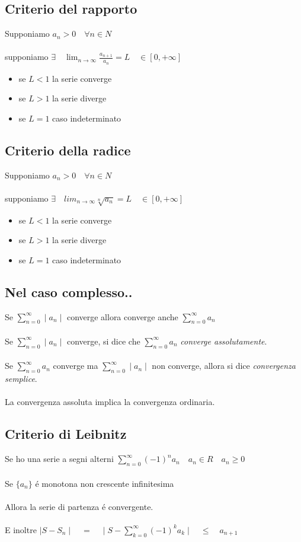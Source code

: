 \documentclass[a4paper,10pt,italian]{article}
\begin{document}
\subsection{Criterio del rapporto}
Supponiamo $a_n > 0 \quad \forall n \in N$ \\ \\
supponiamo $\exists \quad \lim_{n\rightarrow\infty} \frac{a_{n+1}}{a_n} = L \quad \in[0, +\infty]$
\begin{itemize}
\item se $L < 1$ la serie converge
\item se $L > 1$ la serie diverge
\item se $L = 1$ caso indeterminato
\end{itemize}

\subsection{Criterio della radice}
Supponiamo $a_n > 0 \quad \forall n \in N$ \\ \\
supponiamo $\exists \quad lim_{n\rightarrow\infty} \sqrt[n]{a_n} = L \quad \in[0, +\infty]$
\begin{itemize}
\item se $L < 1$ la serie converge
\item se $L > 1$ la serie diverge
\item se $L = 1$ caso indeterminato
\end{itemize}

\subsection{Nel caso complesso..}
Se $\sum_{n=0}^{\infty}\mid a_n \mid$ converge allora converge anche $\sum_{n=0}^{\infty}a_n$ \\ \\ 
Se $\sum_{n=0}^{\infty} \mid a_n \mid$ converge, si dice che $\sum_{n=0}^{\infty}a_n$ \emph{converge assolutamente}. \\ \\
Se $\sum_{n=0}^{\infty}a_n$ converge ma $\sum_{n=0}^{\infty}\mid a_n \mid$ non converge, allora si dice \emph{convergenza semplice}. \\ \\
La convergenza assoluta implica la convergenza ordinaria.

\subsection{Criterio di Leibnitz}
Se ho una serie a segni alterni $\sum_{n=0}^{\infty}(-1)^na_n \quad a_n \in R \quad a_n \geq 0$ \\ \\
Se $\{ a_n \}$ \'e monotona non crescente infinitesima \\ \\
Allora la serie di partenza \'e convergente. \\ \\
E inoltre $\mid S-S_n \mid \quad = \quad \mid S - \sum_{k=0}^{\infty}(-1)^ka_k \mid \quad \leq \quad a_{n+1}$ 
\end{document}

